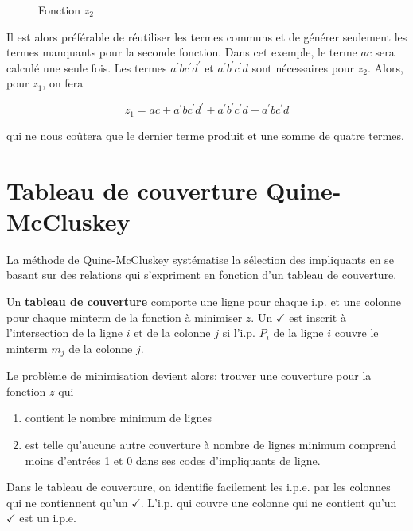 \documentclass[letter, oneside]{book}
\begin{document}
\begin{enumerate}
\begin{figure}[htbp]
\centering

\caption{\label{fig:org1907602}Fonction \(z_2\)}
\end{figure}

Il est alors préférable de réutiliser les termes communs et de générer
seulement les termes manquants pour la seconde fonction. Dans cet
exemple, le terme \(a c\) sera calculé une seule fois. Les termes
\(a^{\prime} b c^{\prime} d^{\prime}\) et \(a^{\prime} b^{\prime}
c^{\prime} d\) sont nécessaires pour \(z_2\). Alors, pour \(z_1\), on
fera

$$z_1 =  a c + a^{\prime}  b c^{\prime} d^{\prime} +
a^{\prime} b^{\prime} c^{\prime} d +
a^{\prime} b c^{\prime} d$$

qui ne nous coûtera que le dernier terme produit et une somme de
quatre termes.
\end{enumerate}


\section{Tableau de couverture Quine-McCluskey}
\label{sec:orgeebb26c}

La méthode de Quine-McCluskey systématise la sélection des impliquants
en se basant sur des relations qui s'expriment en fonction d'un
tableau de couverture.

Un \textbf{tableau de couverture} comporte une ligne pour chaque i.p. et une
colonne pour chaque minterm de la fonction à minimiser \(z\). Un \(\checkmark\) est
inscrit à l'intersection de la ligne \(i\) et de la colonne  \(j\) si
l'i.p.  \(P_i\) de la ligne  \(i\) couvre le minterm  \(m_j\) de la colonne
 \(j\).

Le problème de minimisation devient alors: trouver une couverture pour
la fonction \(z\) qui

\begin{enumerate}
\item contient le nombre minimum de lignes

\item est telle qu'aucune autre couverture à nombre de lignes minimum
comprend moins d'entrées 1 et 0 dans ses codes d'impliquants de
ligne.
\end{enumerate}

Dans le tableau de couverture, on identifie facilement les i.p.e. par
les colonnes qui ne contiennent qu'un \(\checkmark\). L'i.p. qui couvre une colonne
qui ne contient qu'un \(\checkmark\) est un i.p.e.
\end{document}
